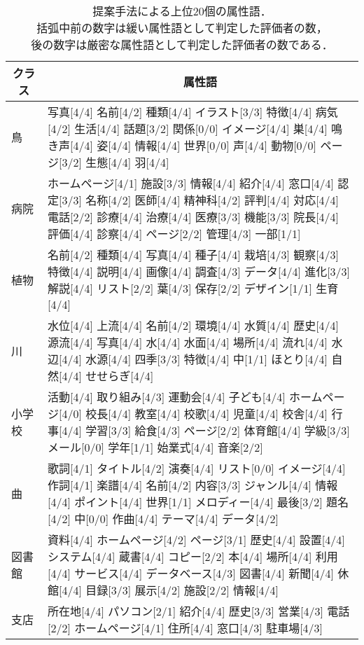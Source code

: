 \begin{table}[th]
\begin{center}
\caption{提案手法による上位20個の属性語． \\括弧中前の数字は緩い属性語として判定した評価者の数，\\後の数字は厳密な属性語として判定した評価者の数である．}
\label{table:example}
\begin{tabular}{|p{1.2cm}|p{12cm}|}
\hline
\multicolumn{1}{|c|}{ クラス } & \multicolumn{1}{|c|}{ 属性語 } \\
\hline
鳥　& 写真[4/4] 名前[4/2] 種類[4/4] イラスト[3/3] 特徴[4/4] 病気[4/2] 生活[4/4] 話題[3/2] 関係[0/0] イメージ[4/4] 巣[4/4] 鳴き声[4/4] 姿[4/4] 情報[4/4] 世界[0/0] 声[4/4] 動物[0/0] ページ[3/2] 生態[4/4] 羽[4/4] \\ \hline 
病院 &  ホームページ[4/1] 施設[3/3] 情報[4/4] 紹介[4/4] 窓口[4/4] 認定[3/3] 名称[4/2] 医師[4/4] 精神科[4/2] 評判[4/4] 対応[4/4] 電話[2/2] 診療[4/4] 治療[4/4] 医療[3/3] 機能[3/3] 院長[4/4] 評価[4/4] 診察[4/4] ページ[2/2] 管理[4/3] 一部[1/1] \\ \hline 
植物 &  名前[4/2] 種類[4/4] 写真[4/4] 種子[4/4] 栽培[4/3] 観察[4/3] 特徴[4/4] 説明[4/4] 画像[4/4] 調査[4/3] データ[4/4] 進化[3/3] 解説[4/4] リスト[2/2] 葉[4/3] 保存[2/2] デザイン[1/1] 生育[4/4] \\ \hline 
川　&  水位[4/4] 上流[4/4] 名前[4/2] 環境[4/4] 水質[4/4] 歴史[4/4] 源流[4/4] 写真[4/4] 水[4/4] 水面[4/4] 場所[4/4] 流れ[4/4] 水辺[4/4] 水源[4/4] 四季[3/3] 特徴[4/4] 中[1/1] ほとり[4/4] 自然[4/4] せせらぎ[4/4] \\ \hline 
小学校 &  活動[4/4] 取り組み[4/3] 運動会[4/4] 子ども[4/4] ホームページ[4/0] 校長[4/4] 教室[4/4] 校歌[4/4] 児童[4/4] 校舎[4/4] 行事[4/4] 学習[3/3] 給食[4/3] ページ[2/2] 体育館[4/4] 学級[3/3] メール[0/0] 学年[1/1] 始業式[4/4] 音楽[2/2] \\ \hline 
曲 &  歌詞[4/1] タイトル[4/2] 演奏[4/4] リスト[0/0] イメージ[4/4] 作詞[4/1] 楽譜[4/4] 名前[4/2] 内容[3/3] ジャンル[4/4] 情報[4/4] ポイント[4/4] 世界[1/1] メロディー[4/4] 最後[3/2] 題名[4/2] 中[0/0] 作曲[4/4] テーマ[4/4] データ[4/2] \\ \hline 
図書館 &  資料[4/4] ホームページ[4/2] ページ[3/1] 歴史[4/4] 設置[4/4] システム[4/4] 蔵書[4/4] コピー[2/2] 本[4/4] 場所[4/4] 利用[4/4] サービス[4/4] データベース[4/3] 図書[4/4] 新聞[4/4] 休館[4/4] 目録[3/3] 展示[4/2] 施設[2/2] 情報[4/4] \\ \hline 
支店 &  所在地[4/4] パソコン[2/1] 紹介[4/4] 歴史[3/3] 営業[4/3] 電話[2/2] ホームページ[4/1] 住所[4/4] 窓口[4/3] 駐車場[4/3] \\ \hline 

\end{tabular}
\end{center}
\end{table}
